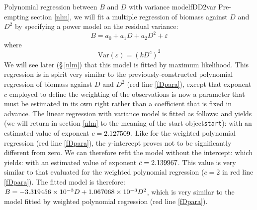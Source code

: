 \begin{filrouge}{Polynomial regression between $B$ and $D$ with variance model}{fDD2var}%
Pre-empting section \ref{nlm}, we will fit a multiple regression of biomass against $D$ and $D^2$ by specifying a power model on the residual variance:
\[
B=a_0+a_1D+a_2D^2+\varepsilon
\]
where
\[
\mathrm{Var}(\varepsilon)=(kD^c)^2
\]
We will see later (\S\,\ref{nlm}) that this model is fitted by maximum likelihood. This regression is in spirit very similar to the previously-constructed polynomial regression of biomass against $D$ and $D^2$ (red line \ref{fDpara}), except that exponent $c$ employed to define the weighting of the observations is now a parameter that must be estimated in its own right rather than a coefficient that is fixed in advance. The linear regression with variance model is fitted as follows:
%
and yields (we will return in section \ref{nlm} to the meaning of the start object\texttt{start}):
%
with an estimated value of exponent $c=\mbox{2.127509}$. Like for the weighted polynomial regression (red line \ref{fDpara}), the y-intercept proves not to be significantly different from zero. We can therefore refit the model without the intercept:
%
%
which yields:
%
with an estimated value of exponent $c=\mbox{2.139967}$. This value is very similar to that evaluated for the weighted polynomial regression ($c=2$ in red line \ref{fDpara}). 
The fitted model is therefore: $B=-\mbox{3.319456}\times10^{-3}D+\mbox{1.067068}\times10^{-3}D^2$, which is very similar to the model fitted by weighted polynomial regression (red line \ref{fDpara}).
\end{filrouge}

